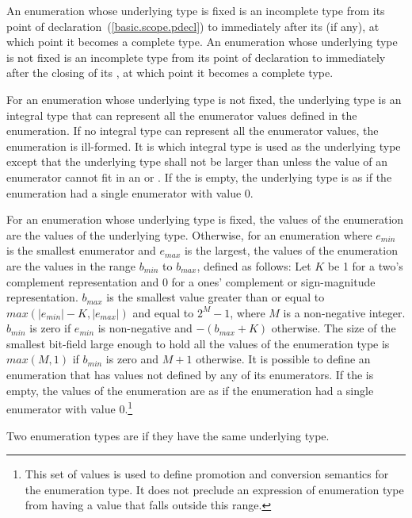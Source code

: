 \pnum
An enumeration whose underlying type is fixed is an incomplete type from its
point of declaration~(\ref{basic.scope.pdecl}) to immediately after its
 (if any), at which point it becomes a complete type.
An enumeration whose underlying type is not fixed is an incomplete type from
its point of declaration to immediately after the closing \tcode{\}} of its
, at which point it becomes a complete type.

\pnum
For an enumeration whose underlying type is not fixed,
the underlying type
is an
integral type that can represent all the enumerator values defined in
the enumeration. If no integral type can represent all the enumerator
values, the enumeration is ill-formed. It is 
which integral type is used as the underlying type 
except that the underlying type shall not be larger than 
unless the value of an enumerator cannot fit in an  or
. If the  is empty, the
underlying type is as if the enumeration had a single enumerator with
value 0.

\pnum
For an enumeration whose underlying type is fixed, the values of
the enumeration are the values of the underlying type. Otherwise,
for an enumeration where $e_\mathit{min}$ is the smallest enumerator and
$e_\mathit{max}$ is the largest, the values of the enumeration are the
values in the range $b_{min}$ to $b_{max}$, defined as follows: Let $K$
be 1 for a two's complement representation and 0 for a ones' complement
or sign-magnitude representation. $b_{max}$ is the smallest value
greater than or equal to $max(|e_{min}| - K, |e_{max}|)$ and equal to
$2^M-1$, where $M$ is a non-negative integer. $b_{min}$ is zero if
$e_{min}$ is non-negative and $-(b_{max}+K)$ otherwise. The size of the
smallest bit-field large enough to hold all the values of the
enumeration type is $max(M,1)$ if $b_{min}$ is zero and $M+1$ otherwise.
It is possible to define an enumeration that has values not defined by
any of its enumerators. If the  is empty, the
values of the enumeration are as if the enumeration had a single enumerator with
value 0.\footnote{This set of values is used to define promotion and
conversion semantics for the enumeration type. It does not preclude an
expression of enumeration type from having a value that falls outside
this range.}

\pnum
Two enumeration types are  if they have the same
underlying type.

